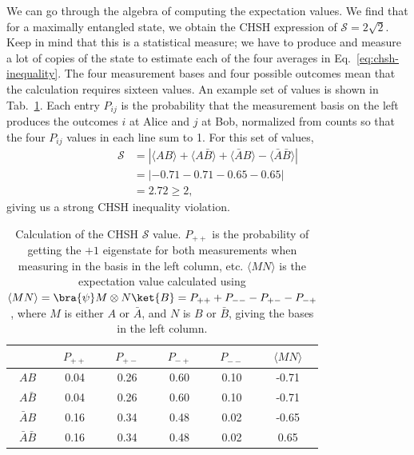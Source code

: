 We can go through the algebra of computing the expectation values.
We find that for a maximally entangled state, we obtain the CHSH expression of $\mathcal{S}=2\sqrt{2}$.
Keep in mind that this is a statistical measure; we have to produce and measure a lot of copies of the state \ket{\psi} to estimate each of the four averages in Eq.~\ref{eq:chsh-inequality}.
The four measurement bases and four possible outcomes mean that the calculation requires sixteen values.
An example set of values is shown in Tab.~\ref{tab:chsh-calculation}.  Each entry $P_{ij}$ is the probability that the measurement basis on the left produces the outcomes $i$ at Alice and $j$ at Bob, normalized from counts so that the four $P_{ij}$ values in each line sum to 1.
For this set of values,
\begin{equation}
\begin{aligned}
    \mathcal{S} &= |\langle A B\rangle+\langle A \bar{B}\rangle+\langle\bar{A} B\rangle-\langle\bar{A} \bar{B}\rangle| \\
    &= | -0.71 -0.71 - 0.65 - 0.65 | \\
    &= 2.72 \geq 2,
\end{aligned}
\label{eq:chsh-example}
\end{equation}
giving us a strong CHSH inequality violation.

\begin{table}[t]
    \setcellgapes{3pt}
    \renewcommand\theadfont{}
    \makegapedcells
    \centering
    \begin{tabular}{cccccc}
        \hline
        & \boldmath$P_{++}$ & \boldmath$P_{+-}$ & \boldmath$P_{-+}$ & \boldmath$P_{--}$ & \boldmath$\langle MN \rangle$ \\
        \hline
        \boldmath$AB$ & 0.04 & 0.26 & 0.60 & 0.10 & -0.71 \\
        \boldmath$A\bar{B}$ & 0.04 & 0.26 & 0.60 & 0.10 & -0.71 \\
        \boldmath$\bar{A}B$ & 0.16 & 0.34 & 0.48 & 0.02 & -0.65 \\
        \boldmath$\bar{A}\bar{B}$ & 0.16 & 0.34 & 0.48 & 0.02 & 0.65 \\
        \hline
    \end{tabular}
    \caption[Calculation of the $\mathcal{S}$ value.]{Calculation of the CHSH $\mathcal{S}$ value. $P_{++}$ is the probability of getting the $+1$ eigenstate for both measurements when measuring in the basis in the left column, etc. $\langle MN \rangle$ is the expectation value calculated using $\langle MN \rangle = \bra{\psi}M\otimes N\ket{B} = P_{++} + P_{--} - P_{+-} - P_{-+}$, where $M$ is either $A$ or $\bar{A}$, and $N$ is $B$ or $\bar{B}$,  giving the bases in the left column.}
    \label{tab:chsh-calculation}
\end{table}

